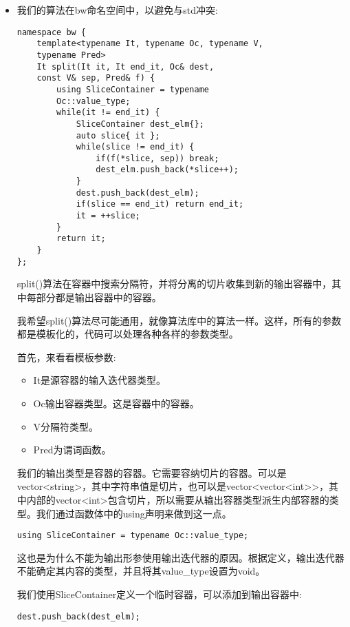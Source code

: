 \begin{itemize}
\item 
我们的算法在bw命名空间中，以避免与std冲突:

\begin{lstlisting}[style=styleCXX]
namespace bw {
	template<typename It, typename Oc, typename V,
	typename Pred>
	It split(It it, It end_it, Oc& dest,
	const V& sep, Pred& f) {
		using SliceContainer = typename
		Oc::value_type;
		while(it != end_it) {
			SliceContainer dest_elm{};
			auto slice{ it };
			while(slice != end_it) {
				if(f(*slice, sep)) break;
				dest_elm.push_back(*slice++);
			}
			dest.push_back(dest_elm);
			if(slice == end_it) return end_it;
			it = ++slice;
		}
		return it;
	}
};
\end{lstlisting}

split()算法在容器中搜索分隔符，并将分离的切片收集到新的输出容器中，其中每部分都是输出容器中的容器。

我希望split()算法尽可能通用，就像算法库中的算法一样。这样，所有的参数都是模板化的，代码可以处理各种各样的参数类型。

首先，来看看模板参数:

\begin{itemize}
\item 
It是源容器的输入迭代器类型。

\item 
Oc输出容器类型。这是容器中的容器。

\item 
V分隔符类型。

\item 
Pred为谓词函数。
\end{itemize}

我们的输出类型是容器的容器。它需要容纳切片的容器。可以是vector<string>，其中字符串值是切片，也可以是vector<vector<int>{}>，其中内部的vector<int>包含切片，所以需要从输出容器类型派生内部容器的类型。我们通过函数体中的using声明来做到这一点。

\begin{lstlisting}[style=styleCXX]
using SliceContainer = typename Oc::value_type;
\end{lstlisting}

这也是为什么不能为输出形参使用输出迭代器的原因。根据定义，输出迭代器不能确定其内容的类型，并且将其value\_type设置为void。

我们使用SliceContainer定义一个临时容器，可以添加到输出容器中:

\begin{lstlisting}[style=styleCXX]
dest.push_back(dest_elm);
\end{lstlisting}


\end{itemize}
